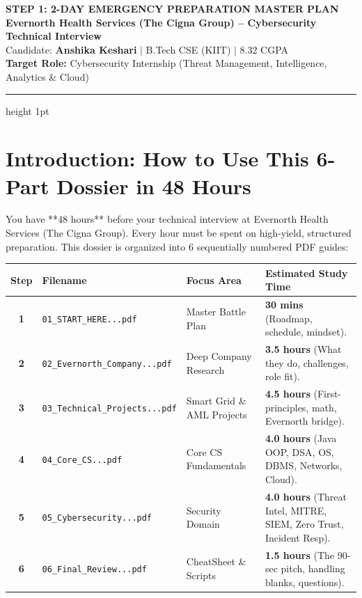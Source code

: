\documentclass[11pt,a4paper]{article}
\begin{document}
\begin{center}
    {\LARGE \bfseries \color{primaryblue} STEP 1: 2-DAY EMERGENCY PREPARATION MASTER PLAN}\\[4pt]
    {\large \bfseries Evernorth Health Services (The Cigna Group) -- Cybersecurity Technical Interview}\\[2pt]
    {\small \color{darkcharcoal} Candidate: \textbf{Anshika Keshari} $|$ B.Tech CSE (KIIT) $|$ 8.32 CGPA}\\[2pt]
    {\footnotesize \textbf{Target Role:} Cybersecurity Internship (Threat Management, Intelligence, Analytics \& Cloud)}
\end{center}
\vspace{-4pt}
\hrule height 1pt
\vspace{8pt}

\section{Introduction: How to Use This 6-Part Dossier in 48 Hours}
You have **48 hours** before your technical interview at Evernorth Health Services (The Cigna Group). Every hour must be spent on high-yield, structured preparation. This dossier is organized into 6 sequentially numbered PDF guides:

\begin{table}[htbp]
\centering
\small
\begin{tabular}{@{}cllp{7.2cm}@{}}
\toprule
\textbf{Step} & \textbf{Filename} & \textbf{Focus Area} & \textbf{Estimated Study Time} \\
\midrule
\textbf{1} & \texttt{01\_START\_HERE...pdf} & Master Battle Plan & \textbf{30 mins} (Roadmap, schedule, mindset). \\
\textbf{2} & \texttt{02\_Evernorth\_Company...pdf} & Deep Company Research & \textbf{3.5 hours} (What they do, challenges, role fit). \\
\textbf{3} & \texttt{03\_Technical\_Projects...pdf} & Smart Grid \& AML Projects & \textbf{4.5 hours} (First-principles, math, Evernorth bridge). \\
\textbf{4} & \texttt{04\_Core\_CS...pdf} & Core CS Fundamentals & \textbf{4.0 hours} (Java OOP, DSA, OS, DBMS, Networks, Cloud). \\
\textbf{5} & \texttt{05\_Cybersecurity...pdf} & Security Domain & \textbf{4.0 hours} (Threat Intel, MITRE, SIEM, Zero Trust, Incident Resp). \\
\textbf{6} & \texttt{06\_Final\_Review...pdf} & CheatSheet \& Scripts & \textbf{1.5 hours} (The 90-sec pitch, handling blanks, questions). \\
\bottomrule
\end{tabular}
\end{table}
\end{document}
